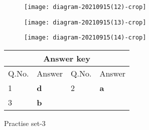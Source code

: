 \begin{enumerate}
\begin{tasks}
\begin{figure}[H]
	\end{figure}
	\task[\textbf{B.}]\begin{figure}[H]
		\centering
		\texttt{[image: diagram-20210915(12)-crop]}
	\end{figure}
	\task[\textbf{C.}]\begin{figure}[H]
		\centering
		\texttt{[image: diagram-20210915(13)-crop]}
	\end{figure}
	\task[\textbf{D.}]\begin{figure}[H]
		\centering
		\texttt{[image: diagram-20210915(14)-crop]}
	\end{figure}
\end{tasks}
\end{enumerate}
\setlength\arrayrulewidth{1pt}
\begin{table}[H]
	\centering
	
	\begin{tabular}{|p{1.5cm}|p{1.5cm}||p{1.5cm}|p{1.5cm}|}
		\hline
		\multicolumn{4}{|c|}{\textbf{Answer key}}\\\hline\hline
		\rowcolor{ocrel}Q.No.&Answer&Q.No.&Answer\\\hline
		1&\textbf{d}&2&\textbf{a}\\\hline
		3&\textbf{b}&&\\\hline
	\end{tabular}
\end{table}
\newpage
\begin{abox}
	Practise set-3
\end{abox}
